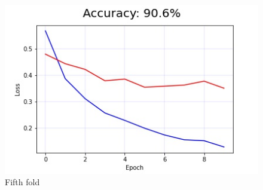\documentclass[11pt]{article}
\begin{document}
\begin{figure}[H]
    \centerline{\includegraphics[scale=.5]{image5.jpg}}
    \caption{Fifth fold}
    \label{fig}
\end{figure}

\pagebreak
\printbibliography
\end{document}
